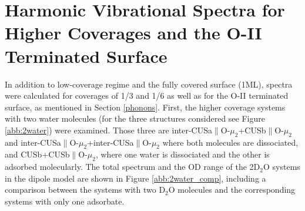 \documentclass[11pt,DIV=13,BCOR=5mm,a4paper,headinclude]{scrbook}
\begin{document}
\def\thefigure{E.\arabic{figure}}
\def\thetable{E.\arabic{table}}
\section{Harmonic Vibrational Spectra for Higher Coverages and the O-II Terminated Surface}\label{app:11-20_freq_hig_cov+O-II}
In addition to low-coverage regime and the fully covered surface (1ML), spectra were calculated for coverages of 1/3 and 1/6 as well as for the O-II terminated surface, as mentioned in Section \ref{phonons}.
First, the higher coverage systems with two water molecules (for the three structures considered see Figure \ref{abb:2water}) were examined. %
Those three are inter-CUSa$\parallel$O-$\mu_2$+CUSb$\parallel$O-$\mu_2$ and inter-CUSa$\parallel$O-$\mu_2$+inter-CUSa$\parallel$O-$\mu_2$ where both molecules are dissociated, and CUSb+CUSb$\parallel$O-$\mu_2$, where one water is dissociated and the other is adsorbed molecularly.
The total spectrum and the OD range of the 2D$_2$O systems in the dipole model are shown in Figure %
\ref{abb:2water_comp}, including a comparison between the systems with two D$_2$O molecules and the corresponding systems with only one adsorbate.
\end{document}
